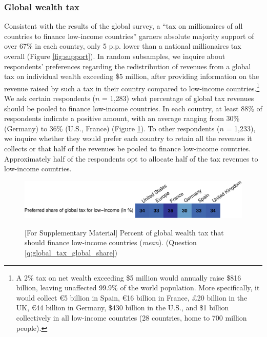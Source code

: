 \subsubsection{Global wealth tax}\label{subsubsec:support_global_wealth_tax}

Consistent with the results of the global survey, a ``tax on millionaires of all countries to finance low-income countries'' garners absolute majority support of over 67\% in each country, only 5 p.p. lower than a national millionaires tax overall (Figure \ref{fig:support}). In random subsamples, we inquire about respondents' preferences regarding the redistribution of revenues from a global tax on individual wealth exceeding \$5 million, after providing information on the revenue raised by such a tax in their country compared to low-income countries.\footnote{A 2\% tax on net wealth exceeding \$5 million would annually raise \$816 billion, leaving unaffected 99.9\% of the world population. More specifically, it would collect \euro{}5 billion in Spain, \euro{}16 billion in France, £20 billion in the UK, \euro{}44 billion in Germany, \$430 billion in the U.S., and \$1 billion collectively in all low-income countries (28 countries, home to 700 million people).%
} We ask certain respondents ($n$ = 1,283) what percentage of global tax revenues should be pooled to finance low-income countries. In each country, at least 88\% of respondents indicate a positive amount, with an average ranging from 30\% (Germany) to 36\% (U.S., France) (Figure \ref{fig:global_share_mean}). To other respondents ($n$ = 1,233), we inquire whether they would prefer each country to retain all the revenues it collects or that half of the revenues be pooled to finance low-income countries. Approximately half of the respondents opt to allocate half of the tax revenues to low-income countries.
\begin{figure}
    \centering 
    \caption[Preferred share of wealth tax for low-income countries]{[For Supplementary Material] Percent of global wealth tax that should finance low-income countries (\textit{mean}). (Question \ref{q:global_tax_global_share})} %
    \includegraphics[width=1\textwidth]{../figures/country_comparison/global_tax_global_share_mean.pdf} \label{fig:global_share_mean}
\end{figure}


